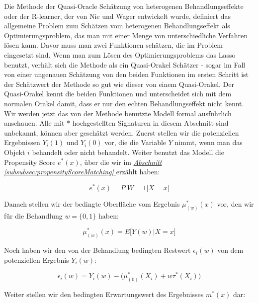 \documentclass[12pt,a4paper,twoside]{scrartcl}
\numberwithin{equation}{section}
\newcommand{\refsec}[1]{\emph{\hyperref[#1]{Abschnitt \ref*{#1} }}}
\begin{document}
Die Methode der Quasi-Oracle Schätzung von heterogenen Behandlungseffekte oder der R-learner, der von Nie und Wager entwickelt wurde, definiert das allgemeine Problem zum Schätzen vom heterogenen Behandlungseffekt als Optimierungsproblem, das man mit einer Menge von unterschiedliche Verfahren lösen kann. Davor muss man zwei Funktionen schätzen, die im Problem eingesetzt sind. Wenn man zum Lösen des Optimierungsproblems das Lasso benutzt, verhält sich die Methode als ein Quasi-Orakel Schätzer - sogar im Fall von einer ungenauen Schätzung von den beiden Funktionen im ersten Schritt ist der Schätzwert der Methode so gut wie dieser von einem Quasi-Orakel. Der Quasi-Orakel kennt die beiden Funktionen und unterscheidet sich mit dem normalen Orakel damit, dass er nur den echten Behandlungseffekt nicht kennt. Wir werden jetzt das von der Methode benutzte Modell formal ausführlich anschauen. Alle mit $*$ hochgestellten Signaturen in diesem Abschnitt sind unbekannt, können aber geschätzt werden. Zuerst stellen wir die potenziellen Ergebnissen $Y_i(1)$ und $Y_i(0)$ vor, die die Variable $Y$ nimmt, wenn man das Objekt $i$ behandelt oder nicht behandelt. Weiter benutzt das Modell die Propensity Score $e^*(x)$, über die wir im \refsec{subsubsec:propensityScoreMatching} erzählt haben:\par

\begin{equation}\label{eq:2.14}
  e^*(x) = P \big [W=1|X=x \big ]
\end{equation}

\noindent
Danach stellen wir der bedingte Oberfläche vom Ergebnis $\mu^*_{(w)}(x)$ vor, den wir für die Behandlung $w =\{0,1\}$ haben:\par

\begin{equation}\label{eq:2.15}
 \mu^*_{(w)}(x) = E \big [Y(w)|X=x \big ]
\end{equation}
 
\noindent
Noch haben wir den von der Behandlung bedingten Restwert $\epsilon_i(w)$ von dem potenziellen Ergebnis $Y_i(w)$:\par

\begin{equation}\label{eq:2.16}
 \epsilon_i(w) = Y_i(w)- \big (\mu^*_{(0)}(X_i) + w\tau^*(X_i) \big )   
\end{equation}

\noindent
Weiter stellen wir den bedingten Erwartungswert des Ergebnisses $m^*(x)$ dar:\par
\end{document}

